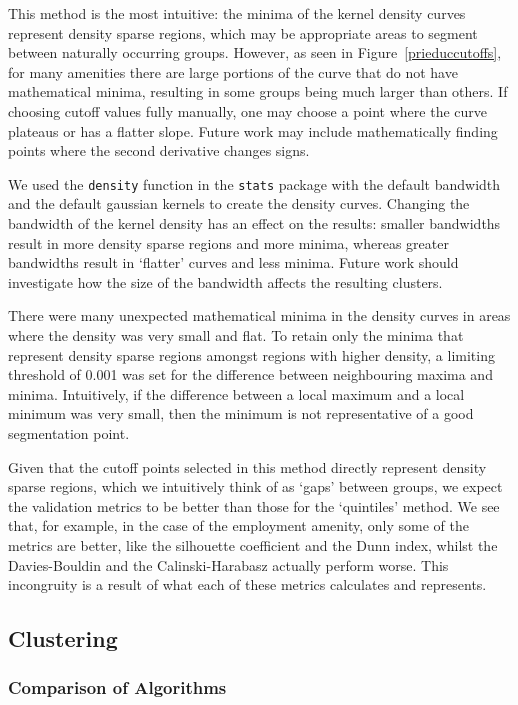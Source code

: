\documentclass[11pt, a4paper]{article}
\begin{document}
This method is the most intuitive: the minima of the kernel density curves represent density sparse regions, which may be appropriate areas to segment between naturally occurring groups. However, as seen in Figure~\ref{prieduccutoffs}, for many amenities there are large portions of the curve that do not have mathematical minima, resulting in some groups being much larger than others. If choosing cutoff values fully manually, one may choose a point where the curve plateaus or has a flatter slope. Future work may include mathematically finding points where the second derivative changes signs. 
\par
We used the \texttt{density} function in the \texttt{stats} package with the default bandwidth and the default gaussian kernels to create the density curves. Changing the bandwidth of the kernel density has an effect on the results: smaller bandwidths result in more density sparse regions and more minima, whereas greater bandwidths result in `flatter' curves and less minima. Future work should investigate how the size of the bandwidth affects the resulting clusters. 
\par
There were many unexpected mathematical minima in the density curves in areas where the density was very small and flat. To retain only the minima that represent density sparse regions amongst regions with higher density, a limiting threshold of 0.001 was set for the difference between neighbouring maxima and minima. Intuitively, if the difference between a local maximum and a local minimum was very small, then the minimum is not representative of a good segmentation point. 
\par
Given that the cutoff points selected in this method directly represent density sparse regions, which we intuitively think of as `gaps' between groups, we expect the validation metrics to be better than those for the `quintiles' method. We see that, for example, in the case of the employment amenity, only some of the metrics are better, like the silhouette coefficient and the Dunn index, whilst the Davies-Bouldin and the Calinski-Harabasz actually perform worse. This incongruity is a result of what each of these metrics calculates and represents. 





\subsection{Clustering}

\subsubsection{Comparison of Algorithms}
\end{document}
